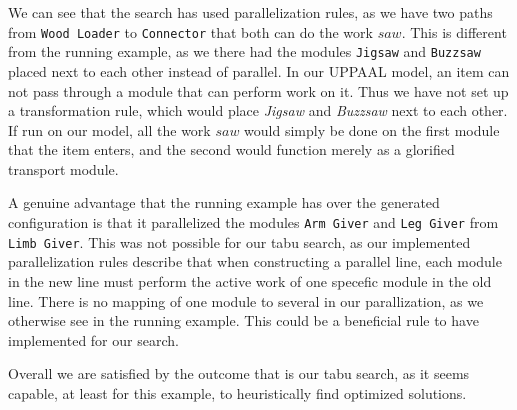 We can see that the search has used parallelization rules, as we have two paths from \texttt{Wood Loader} to \texttt{Connector} that both can do the work $saw$. This is different from the running example, as we there had the modules \texttt{Jigsaw} and \texttt{Buzzsaw} placed next to each other instead of parallel. In our UPPAAL model, an item can not pass through a module that can perform work on it. Thus we have not set up a transformation rule, which would place \textit{Jigsaw} and \textit{Buzzsaw} next to each other. If run on our model, all the work $saw$ would simply be done on the first module that the item enters, and the second would function merely as a glorified transport module.

A genuine advantage that the running example has over the generated configuration is that it parallelized the modules \texttt{Arm Giver} and \texttt{Leg Giver} from \texttt{Limb Giver}. This was not possible for our tabu search, as our implemented parallelization rules describe that when constructing a parallel line, each module in the new line must perform the active work of one specefic module in the old line. There is no mapping of one module to several in our parallization, as we otherwise see in the running example. This could be a beneficial rule to have implemented for our search.

Overall we are satisfied by the outcome that is our tabu search, as it seems capable, at least for this example, to heuristically find optimized solutions.
